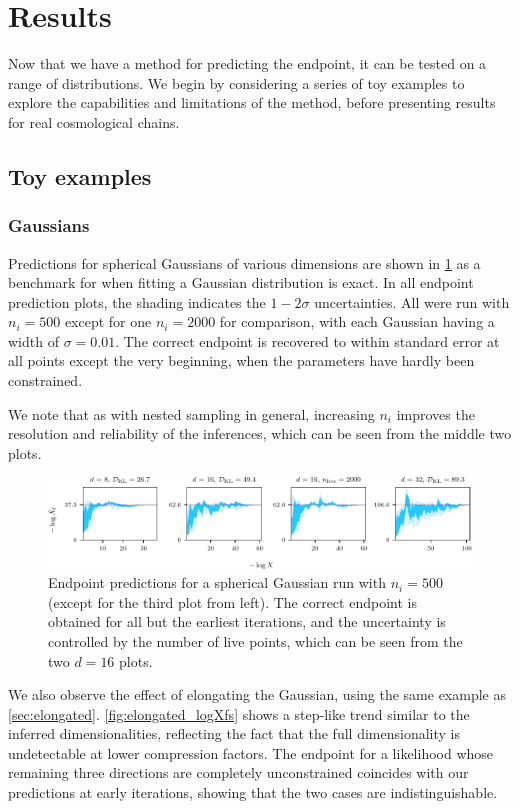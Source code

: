 \documentclass[usenatbib]{mnras}
\newcommand{\nlive}{n_i}
\begin{document}
\section{Results}\label{sec:results}
Now that we have a method for predicting the endpoint, it can be tested on a range of distributions. We begin by considering a series of toy examples to explore the capabilities and limitations of the method, before presenting results for real cosmological chains.
\subsection{Toy examples}
\subsubsection{Gaussians}
Predictions for spherical Gaussians of various dimensions are shown in \cref{fig:gauss_predictions} as a benchmark for when fitting a Gaussian distribution is exact. In all endpoint prediction plots, the shading indicates the $1-2\sigma$ uncertainties. All were run with $\nlive = 500$ except for one $\nlive=2000$ for comparison, with each Gaussian having a width of $\sigma = 0.01$. The correct endpoint is recovered to within standard error at all points except the very beginning, when the parameters have hardly been constrained. 
\par
We note that as with nested sampling in general, increasing $\nlive$ improves the resolution and reliability of the inferences, which can be seen from the middle two plots.
\begin{figure}
\begin{center}
    \includegraphics{figures/gauss_predictions.pdf}
\end{center}
\caption{Endpoint predictions for a spherical Gaussian run with $\nlive=500$ (except for the third plot from left). The correct endpoint is obtained for all but the earliest iterations, and the uncertainty is controlled by the number of live points, which can be seen from the two $d = 16$ plots.}
\label{fig:gauss_predictions}
\end{figure}
We also observe the effect of elongating the Gaussian, using the same example as \cref{sec:elongated}. \cref{fig:elongated_logXfs} shows a step-like trend similar to the inferred dimensionalities, reflecting the fact that the full dimensionality is undetectable at lower compression factors. The endpoint for a likelihood whose remaining three directions are completely unconstrained coincides with our predictions at early iterations, showing that the two cases are indistinguishable. 
\end{document}
